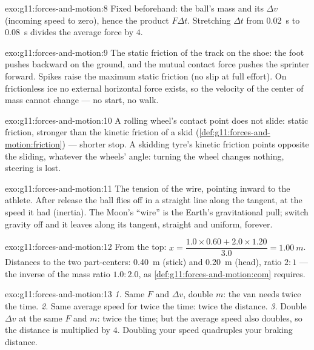 \begin{solution}{exo:g11:forces-and-motion:8}
Fixed beforehand: the ball's mass and its $\Delta v$ (incoming speed to
zero), hence the product $F\Delta t$. Stretching $\Delta t$ from
\qty{0.02}{s} to \qty{0.08}{s} divides the average force by $4$.
\end{solution}

\begin{solution}{exo:g11:forces-and-motion:9}
The static friction of the track on the shoe: the foot pushes backward
on the ground, and the mutual contact force pushes the sprinter
forward. Spikes raise the maximum static friction (no slip at full
effort). On frictionless ice no external horizontal force exists, so
the velocity of the center of mass cannot change --- no start, no walk.
\end{solution}

\begin{solution}{exo:g11:forces-and-motion:10}
A rolling wheel's contact point does not slide: static friction,
stronger than the kinetic friction of a skid
(\cref{def:g11:forces-and-motion:friction}) --- shorter stop. A
skidding tyre's kinetic friction points opposite the sliding, whatever
the wheels' angle: turning the wheel changes nothing, steering is lost.
\end{solution}

\begin{solution}{exo:g11:forces-and-motion:11}
The tension of the wire, pointing inward to the athlete. After release
the ball flies off in a straight line along the tangent, at the speed
it had (inertia). The Moon's ``wire'' is the Earth's gravitational
pull; switch gravity off and it leaves along its tangent, straight and
uniform, forever.
\end{solution}

\begin{solution}{exo:g11:forces-and-motion:12}
From the top: $x = \dfrac{1.0 \times 0.60 + 2.0 \times 1.20}{3.0}
= \qty{1.00}{m}$. Distances to the two part-centers: \qty{0.40}{m}
(stick) and \qty{0.20}{m} (head), ratio $2 : 1$ --- the inverse of the
mass ratio $1.0 : 2.0$, as \cref{def:g11:forces-and-motion:com}
requires.
\end{solution}

\begin{solution}{exo:g11:forces-and-motion:13}
\emph{1.} Same $F$ and $\Delta v$, double $m$: the van needs twice the
time. \emph{2.} Same average speed for twice the time: twice the
distance. \emph{3.} Double $\Delta v$ at the same $F$ and $m$: twice
the time; but the average speed also doubles, so the distance is
multiplied by $4$. Doubling your speed quadruples your braking
distance.
\end{solution}

